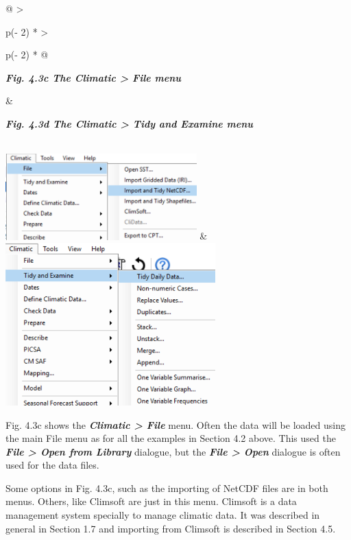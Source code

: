 \documentclass[
  letterpaper,
  DIV=11,
  numbers=noendperiod]{scrreprt}
\begin{document}
\begin{longtable}[]{@{}
  >{\raggedright\arraybackslash}p{(\columnwidth - 2\tabcolsep) * }
  >{\raggedright\arraybackslash}p{(\columnwidth - 2\tabcolsep) * }@{}}
\toprule\noalign{}
\begin{minipage}[b]{\linewidth}\raggedright
\textbf{\emph{Fig. 4.3c The Climatic \textgreater{} File menu}}
\end{minipage} & \begin{minipage}[b]{\linewidth}\raggedright
\textbf{\emph{Fig. 4.3d The Climatic \textgreater{} Tidy and Examine
menu}}
\end{minipage} \\
\midrule\noalign{}
\endhead
\bottomrule\noalign{}
\endlastfoot
\includegraphics[width=2.90215in,height=1.30645in]{figures/Fig4.3c.png}
&
\includegraphics[width=3.19258in,height=2.46625in]{figures/Fig4.3d.png} \\
\end{longtable}

Fig. 4.3c shows the \textbf{\emph{Climatic \textgreater{} File}} menu.
Often the data will be loaded using the main File menu as for all the
examples in Section 4.2 above. This used the \textbf{\emph{File
\textgreater{} Open from Library}} dialogue, but the \textbf{\emph{File
\textgreater{} Open}} dialogue is often used for the data files.

Some options in Fig. 4.3c, such as the importing of NetCDF files are in
both menus. Others, like Climsoft are just in this menu. Climsoft is a
data management system specially to manage climatic data. It was
described in general in Section 1.7 and importing from Climsoft is
described in Section 4.5.
\end{document}
